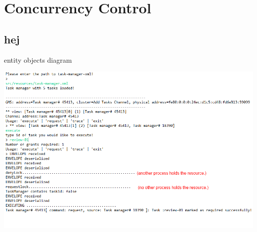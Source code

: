 \chapter{Concurrency Control}

\section{hej}

\begin{center}
\centering
\caption{entity objects diagram}
\includegraphics[scale=0.6]{images/Concurrency_run.png}
\end{center}
\vspace{10pt}
